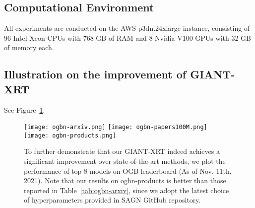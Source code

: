 \documentclass{article} %
\begin{document}
\subsection{Computational Environment}
All experiments are conducted on the AWS p3dn.24xlarge instance, consisting of
96 Intel Xeon CPUs with 768 GB of RAM and 8 Nvidia V100 GPUs with 32 GB of memory each.

\subsection{Illustration on the improvement of GIANT-XRT}\label{app:improvement}
See Figure~\ref{fig:improvement}.
\begin{figure}[h]
\centering
  \texttt{[image: ogbn-arxiv.png]}
  \texttt{[image: ogbn-papers100M.png]}
  \texttt{[image: ogbn-products.png]}
\caption{To further demonstrate that our GIANT-XRT indeed achieves a significant improvement over state-of-the-art methods, we plot the performance of top 8 models on OGB leaderboard (As of Nov. 11th, 2021). Note that our results on ogbn-products is better than those reported in Table~\ref{tab:ogbn-arxiv}, since we adopt the latest choice of hyperparameters provided in SAGN GitHub repository.}\label{fig:improvement}
\vspace{-0.1in}
\end{figure}
\end{document}
